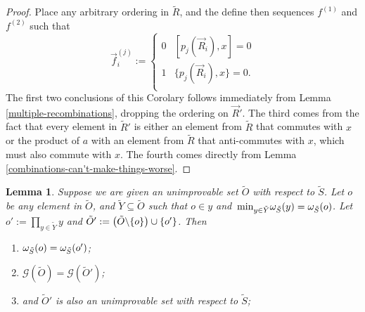 \documentclass[twocolumn,showpacs,preprintnumbers,amsmath,amssymb,nofootinbib,pra,floatfix]{revtex4-1}
\newtheorem{lemma}{Lemma}
\newcommand{\lst}{\vec}
\newcommand{\set}{\tilde}
\newcommand{\genfun}{\mathcal{G}}
\begin{document}
\begin{proof}
Place any arbitrary ordering in $\set R$, and the define then sequences $f^{(1)}$ and $f^{(2)}$ such that
$$\lst f^{(j)}_i :=
\begin{cases}
0 & [p_j(\lst R_i),x] = 0 \\
1 & \{p_j(\lst R_i),x\} = 0. \\
\end{cases}
$$
The first two conclusions of this Corolary follows immediately from Lemma \ref{multiple-recombinations}, dropping the ordering on $\lst R'$.  The third comes from the fact that every element in $\set R'$ is either an element from $\set R$ that commutes with $x$ or the product of $a$ with an element from $\set R$ that anti-commutes with $x$, which must also commute with $x$.  The fourth comes directly from Lemma \ref{combinations-can't-make-things-worse}.
\end{proof}
\begin{lemma}
\label{replacing element with product preserves unimprovability}
Suppose we are given an unimprovable set $\set O$ with respect to $\set S$.  Let $o$ be any element in $\set O$, and $\set Y\subseteq \set O$ such that $o\in y$ and $\min_{y\in\set Y}\om_{\set S}(y)=\om_{\set S}(o)$.  Let $o':=\prod_{y\in\set Y}y$ and $\set O' := \paren{\set O\backslash\{o\}}\cup\{o'\}$.  Then
\begin{enumerate}
\item $\om_{\set S}(o)=\om_{\set S}(o')$;
\item $\genfun(\set O)=\genfun(\set O')$;
\item and $\set O'$ is also an unimprovable set with respect to $\set S$;
\end{enumerate}
\end{lemma}
\end{document}
